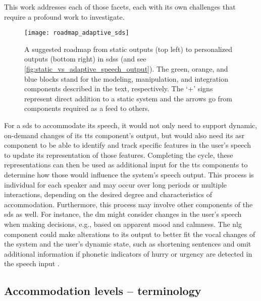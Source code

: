 This work addresses each of those facets, each with its own challenges that require a profound work to investigate.
%
\begin{figure}[t]
	\centering
	\texttt{[image: roadmap\_adaptive\_sds]}
	\caption[Roadmap to phonetically adaptive \acl{sds}]
		{A suggested roadmap from static outputs (top left) to personalized outputs (bottom right) in \acp{sds} (and see \cref{fig:static_vs_adaptive_speech_output}).
		The green, orange, and blue blocks stand for the modeling, manipulation, and integration components described in the text, respectively.
		The \enquote*{+} signs represent direct addition to a static system and the arrows go from components required as a feed to others.}
	\label{fig:roadmap_adaptive_sds}
\end{figure}
%
For a \ac{sds} to accommodate its speech, it would not only need to support dynamic, on-demand changes of its \ac{tts} component's output, but would also need its \ac{asr} component to be able to identify and track specific features in the user's speech to update its representation of those features.
Completing the cycle, these representations can then be used as additional input for the \ac{tts} components to determine how those would influence the system's speech output.
This process is individual for each speaker and may occur over long periods or multiple interactions, depending on the desired degree and characteristics of accommodation.
Furthermore, this process may involve other components of the \ac{sds} as well.
For instance, the \ac{dm} might consider changes in the user's speech when making decisions, e.g., based on apparent mood and calmness.
The \ac{nlg} component could make alterations to its output to better fit the vocal changes of the system and the user's dynamic state, such as shortening sentences and omit additional information if phonetic indicators of hurry or urgency are detected in the speech input \citep{Edworthy2003acoustic}.

\subsection{Accommodation levels -- terminology}
\label{subsec:accommodation_levels}

